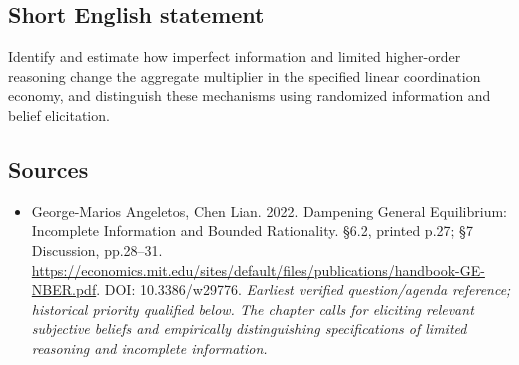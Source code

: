 \documentclass[11pt]{article}
\begin{document}
\subsection{Short English statement}
Identify and estimate how imperfect information and limited higher-order reasoning change the aggregate multiplier in the specified linear coordination economy, and distinguish these mechanisms using randomized information and belief elicitation.

\subsection{Sources}
\begin{itemize}\raggedright
\item[\textnormal{[S1]}]\hypertarget{source:30007553:1}{} George-Marios Angeletos, Chen Lian. 2022. Dampening General Equilibrium: Incomplete Information and Bounded Rationality. §6.2, printed p.27; §7 Discussion, pp.28–31.
\url{https://economics.mit.edu/sites/default/files/publications/handbook-GE-NBER.pdf}.
DOI: 10.3386/w29776.
{\small\textit{Earliest verified question/agenda reference; historical priority qualified below. The chapter calls for eliciting relevant subjective beliefs and empirically distinguishing specifications of limited reasoning and incomplete information.}}
\end{itemize}
\end{document}
